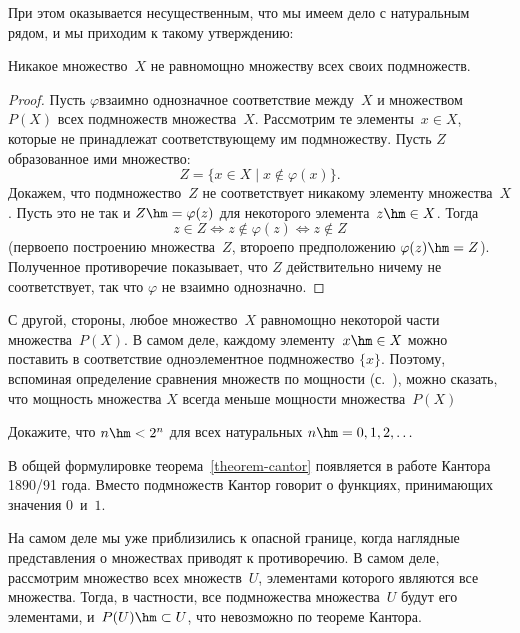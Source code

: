 При этом оказывается несущественным, что мы имеем дело с
натуральным рядом, и мы приходим к такому утверждению:

\begin{theorem}
        \label{theorem-cantor}%
Никакое множество~$X$ не равномощно множеству всех своих
подмножеств.
\end{theorem}

\begin{proof}
Пусть $\varphi$\т взаимно однозначное соответствие между~$X$ и
множеством $P(X)$ всех подмножеств множества~$X$. Рассмотрим те
элементы~$x\in X$, которые не принадлежат соответствующему им подмножеству.
Пусть $Z$\т образованное ими множество:
        $$
Z = \{ x\in X \mid x \notin \varphi(x) \}.
        $$
Докажем, что подмножество~$Z$ не соответствует никакому
элементу множества~$X$. Пусть это не так и $Z\hm=\varphi(z)$ для некоторого
элемента~$z\hm\in X$. Тогда
        $$
z \in Z \Leftrightarrow z \notin \varphi(z) \Leftrightarrow z \notin Z
        $$
(первое\т по построению множества~$Z$, второе\т по предположению
$\varphi(z)\hm=Z$). Полученное противоречие показывает, что
$Z$ действительно ничему не соответствует, так что $\varphi$
не взаимно однозначно.
\end{proof}

С другой, стороны, любое множество~$X$ равномощно некоторой
части множества~$P(X)$. В самом деле, каждому элементу~$x\hm\in X$ можно
поставить в соответствие одноэлементное подмножество $\{x\}$.
Поэтому, вспоминая определение сравнения множеств по мощности
(с.~\pageref{comparing-cardinalities}), можно сказать, что мощность
множества $X$ всегда меньше мощности множества~$P(X)$

\begin{problem}
Докажите, что $n\hm<2^n$ для всех натуральных $n\hm=0,1,2,\dots$
\end{problem}

\begin{historyremark}
В общей формулировке теорема~\ref{theorem-cantor} появляется в работе Кантора
1890/91 года. Вместо подмножеств Кантор говорит о функциях,
принимающих значения $0$~и~$1$.
\end{historyremark}

На самом деле мы уже приблизились к опасной границе, когда
наглядные представления о множествах приводят к противоречию. В
самом деле, рассмотрим множество всех множеств~$U$, элементами
которого являются все множества. Тогда, в частности, все
подмножества множества~$U$ будут его элементами,
и~$P(U)\hm\subset U$, что невозможно по теореме Кантора.

